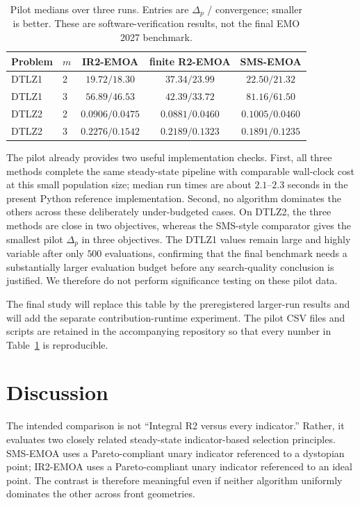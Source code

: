 \documentclass[runningheads]{llncs}
\begin{document}
\begin{table}[t]
\centering
\caption{Pilot medians over three runs.  Entries are $\Delta_p$ / convergence; smaller is better.  These are software-verification results, not the final EMO 2027 benchmark.}
\label{tab:pilot}
\small
\begin{tabular}{llccc}
\toprule
Problem & $m$ & IR2-EMOA & finite R2-EMOA & SMS-EMOA\\
\midrule
DTLZ1 & 2 & $19.72/18.30$ & $37.34/23.99$ & $22.50/21.32$\\
DTLZ1 & 3 & $56.89/46.53$ & $42.39/33.72$ & $81.16/61.50$\\
DTLZ2 & 2 & $0.0906/0.0475$ & $0.0881/0.0460$ & $0.1005/0.0460$\\
DTLZ2 & 3 & $0.2276/0.1542$ & $0.2189/0.1323$ & $0.1891/0.1235$\\
\bottomrule
\end{tabular}
\end{table}

The pilot already provides two useful implementation checks.  First, all three methods complete the same steady-state pipeline with comparable wall-clock cost at this small population size; median run times are about $2.1$--$2.3$ seconds in the present Python reference implementation.  Second, no algorithm dominates the others across these deliberately under-budgeted cases.  On DTLZ2, the three methods are close in two objectives, whereas the SMS-style comparator gives the smallest pilot $\Delta_p$ in three objectives.  The DTLZ1 values remain large and highly variable after only $500$ evaluations, confirming that the final benchmark needs a substantially larger evaluation budget before any search-quality conclusion is justified.  We therefore do not perform significance testing on these pilot data.

The final study will replace this table by the preregistered larger-run results and will add the separate contribution-runtime experiment.  The pilot CSV files and scripts are retained in the accompanying repository so that every number in Table~\ref{tab:pilot} is reproducible.

\section{Discussion}
\label{sec:discussion}

The intended comparison is not ``Integral R2 versus every indicator.'' Rather, it evaluates two closely related steady-state indicator-based selection principles. SMS-EMOA uses a Pareto-compliant unary indicator referenced to a dystopian point; IR2-EMOA uses a Pareto-compliant unary indicator referenced to an ideal point. The contrast is therefore meaningful even if neither algorithm uniformly dominates the other across front geometries.
\end{document}
